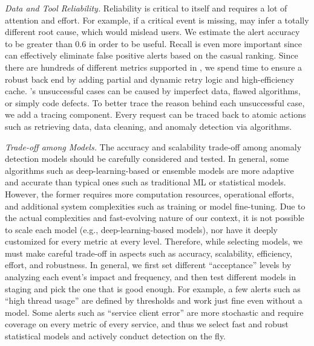 \emph{Data and Tool Reliability.} Reliability is critical to \system itself and requires a lot of attention and effort. For example, if a critical event is missing, \system may infer a totally different root cause, which would mislead users. %
We estimate the alert accuracy 
to be greater than 0.6 in order to be useful. Recall is even more important since \system can effectively eliminate false positive alerts based on the casual ranking. Since there are hundreds of different metrics supported in \system, we spend time to ensure a robust back end by adding partial and dynamic retry logic and high-efficiency cache. \system's unsuccessful cases can be caused by imperfect data, flawed algorithms, or simply code defects. To better trace the reason behind each unsuccessful case, we add a tracing component. Every \system request can be traced back to atomic actions such as retrieving data, data cleaning, and anomaly detection via algorithms.

\emph{Trade-off among Models.} The accuracy and scalability trade-off among anomaly detection models should be carefully considered and tested. In general, some algorithms such as deep-learning-based or ensemble models are more adaptive and accurate than typical ones such as traditional ML or statistical models. However, the former requires more computation resources, operational efforts, and additional system complexities such as training or model fine-tuning. Due to the actual complexities and fast-evolving nature of our context, it is not possible to scale each model (e.g., deep-learning-based models), nor have it deeply customized for every metric at every level. Therefore, while selecting models, we must make careful trade-off in aspects such as accuracy, scalability, efficiency, effort, and robustness. In general, we first set different ``acceptance'' levels by analyzing each event's impact and frequency, and then test different models in staging and pick the one that is good enough. For example, a few alerts such as ``high thread usage'' are defined by thresholds and work just fine even without a model. Some alerts such as  ``service client error'' are more stochastic and require coverage on every metric of every service, and thus we select fast and robust statistical models and actively conduct detection on the fly.  %

